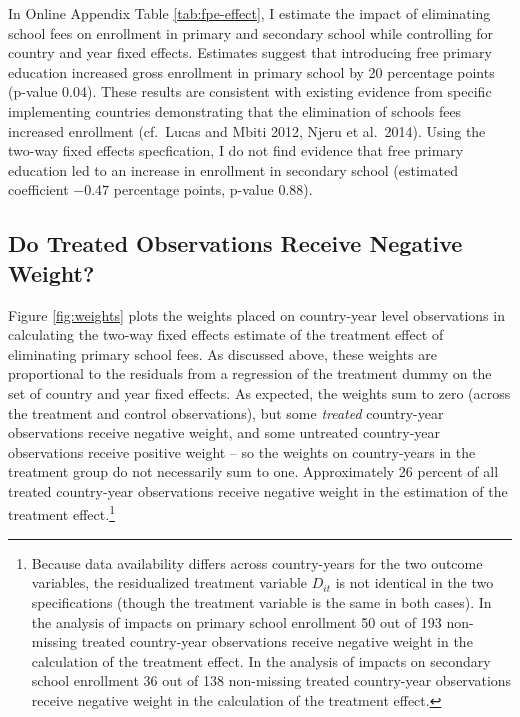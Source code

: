 \documentclass[11pt]{article}
\begin{document}
In Online Appendix Table \ref{tab:fpe-effect}, I estimate the impact of eliminating school fees on enrollment in primary and secondary school 
while controlling for country and year fixed effects.  Estimates suggest that introducing free primary education increased 
gross enrollment in primary school by 20 percentage points (p-value 0.04).  These results are consistent with existing 
evidence from specific implementing countries demonstrating that the elimination of schools fees increased enrollment 
(cf.~Lucas and Mbiti 2012, Njeru et al.~2014).  Using the two-way fixed effects specfication, I do not 
find evidence that free primary education led to an increase 
in enrollment in secondary school (estimated coefficient $-0.47$ percentage points, p-value 0.88).

\nocite{LucasMbiti2012}
\nocite{NjeruEtAl2014}
\nocite{Koski2018}

\subsection{Do Treated Observations Receive Negative Weight?}

Figure \ref{fig:weights} plots the weights placed on country-year level observations in calculating 
the two-way fixed effects estimate of the treatment effect of eliminating primary school fees.  As discussed above, 
these weights are proportional to the residuals from a regression of the treatment dummy on the set of country and year fixed effects.  
As expected, the weights sum to zero (across the treatment and control observations), but some \emph{treated} country-year observations 
receive negative weight, and some untreated country-year observations receive positive weight -- so the weights on 
country-years in the treatment group do not necessarily sum to one.  
Approximately 26 percent of all treated country-year observations receive negative weight in 
the estimation of the treatment effect.\footnote{Because data availability differs 
across country-years for the two outcome variables, the residualized treatment variable $D_{it}$ is not identical 
in the two specifications (though the treatment variable is the same in both cases).  In the analysis of impacts 
on primary school enrollment 50 out of 193 non-missing treated country-year 
observations receive negative weight in the calculation of the treatment effect.  
In the analysis of impacts on secondary school enrollment 36 out of 138 non-missing treated country-year observations 
receive negative weight in the calculation of the treatment effect.} 
\end{document}
